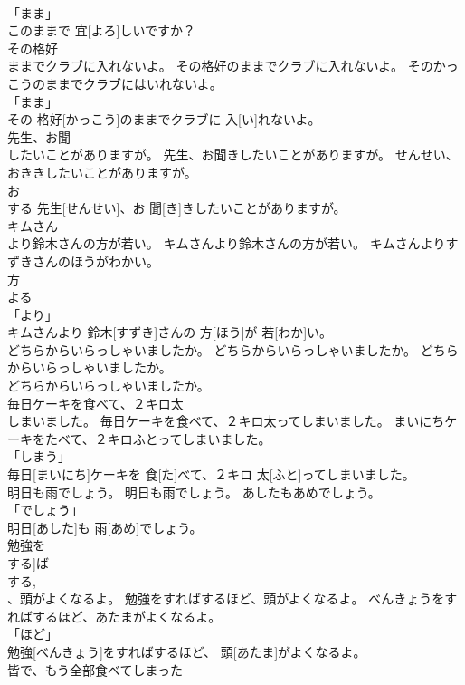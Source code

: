 \documentclass[8pt]{extreport}
\begin{document}
\begin{CJK}{UTF8}{min}
\\	「まま」 
\\	このままで 宜[よろ]しいですか？		
\\	その格好
\\	ままでクラブに入れないよ。	その格好のままでクラブに入れないよ。	そのかっこうのままでクラブにはいれないよ。	
\\	「まま」 
\\	その 格好[かっこう]のままでクラブに 入[い]れないよ。		
\\	先生、お聞
\\	したいことがありますが。	先生、お聞きしたいことがありますが。	せんせい、おききしたいことがありますが。	
\\	お 
\\	する	先生[せんせい]、お 聞[き]きしたいことがありますが。		
\\	キムさん
\\	より鈴木さんの方が若い。	キムさんより鈴木さんの方が若い。	キムさんよりすずきさんのほうがわかい。	
\\	方 
\\	よる 
\\	「より」 
\\	キムさんより 鈴木[すずき]さんの 方[ほう]が 若[わか]い。		
\\	どちらからいらっしゃいましたか。	どちらからいらっしゃいましたか。	どちらからいらっしゃいましたか。	
\\	どちらからいらっしゃいましたか。		
\\	毎日ケーキを食べて、２キロ太
\\	しまいました。	毎日ケーキを食べて、２キロ太ってしまいました。	まいにちケーキをたべて、２キロふとってしまいました。	
\\	「しまう」 
\\	毎日[まいにち]ケーキを 食[た]べて、２キロ 太[ふと]ってしまいました。		
\\	明日も雨でしょう。	明日も雨でしょう。	あしたもあめでしょう。	
\\	「でしょう」 
\\	明日[あした]も 雨[あめ]でしょう。		
\\	勉強を
\\	する]ば
\\	する, 
\\	、頭がよくなるよ。	勉強をすればするほど、頭がよくなるよ。	べんきょうをすればするほど、あたまがよくなるよ。	
\\	「ほど」 
\\	勉強[べんきょう]をすればするほど、 頭[あたま]がよくなるよ。		
\\	皆で、もう全部食べてしまった

\end{CJK}
\end{document}
